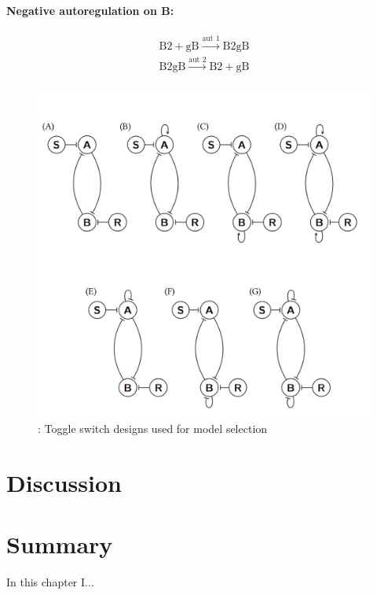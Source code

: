 \paragraph{Negative autoregulation on B:}
$$
\begin{array}{cccc} 
    \textrm{B2} + \textrm{gB} \stackrel{\textrm{aut 1}}{\longrightarrow} \textrm{B2gB} \\
    \textrm{B2gB} \stackrel{\textrm{aut 2}}{\longrightarrow} \textrm{B2}+ \textrm{gB}  \\
\end{array}
$$


\begin{figure}[htbp]
	\begin{center}
\includegraphics[scale=0.7]{chapterABCSysBio/images/toggle_switch_designs.png}
\caption[LoF caption]{\label{fig:toggle_switch_designs}: Toggle switch designs used for model selection}
\end{center}
\end{figure}
\clearpage
\section{Discussion}
\section{Summary}

In this chapter I...


